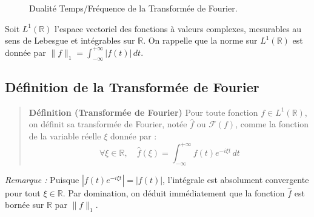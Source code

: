 \documentclass[11pt,a4paper]{article}
\begin{document}
\begin{figure}[h]
\centering
{}
\quad\quad
{}
\caption{Dualité Temps/Fréquence de la Transformée de Fourier.}
\end{figure}


Soit $L^1(\mathbb{R})$ l'espace vectoriel des fonctions à valeurs complexes, mesurables au sens de Lebesgue et intégrables sur $\mathbb{R}$. On rappelle que la norme sur $L^1(\mathbb{R})$ est donnée par $\|f\|_1 = \int_{-\infty}^{+\infty} |f(t)| \, dt$.

\subsection{Définition de la Transformée de Fourier}

\begin{quote}\textbf{Définition (Transformée de Fourier)}
Pour toute fonction $f \in L^1(\mathbb{R})$, on définit sa transformée de Fourier, notée $\hat{f}$ ou $\mathcal{F}(f)$, comme la fonction de la variable réelle $\xi$ donnée par :
$$ \forall \xi \in \mathbb{R}, \quad \hat{f}(\xi) = \int_{-\infty}^{+\infty} f(t) e^{-i\xi t} \, dt $$\end{quote}

\textit{Remarque :} Puisque $|f(t) e^{-i\xi t}| = |f(t)|$, l'intégrale est absolument convergente pour tout $\xi \in \mathbb{R}$. Par domination, on déduit immédiatement que la fonction $\hat{f}$ est bornée sur $\mathbb{R}$ par $\|f\|_1$.
\end{document}
